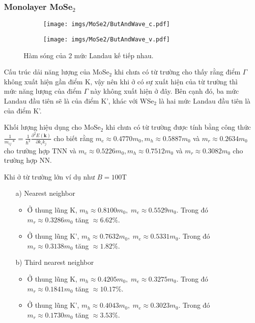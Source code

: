 \documentclass{article}
\begin{document}
\subsubsection*{Monolayer MoSe$_{2}$}
\begin{figure}[htb]
	\begin{subfigure}{0.495\textwidth}
		\centering
		\texttt{[image: imgs/MoSe2/ButAndWave\_c.pdf]}
	\end{subfigure}
	\begin{subfigure}{0.495\textwidth}
		\centering
		\texttt{[image: imgs/MoSe2/ButAndWave\_v.pdf]}
	\end{subfigure}
	\caption{Hàm sóng của 2 mức Landau kế tiếp nhau.}
\end{figure}
Cấu trúc dải năng lượng của MoSe$_{2}$ khi chưa có từ trường cho thấy rằng điểm $\Gamma$ không xuất hiện gần điểm K, vậy nên khi ở có sự xuất hiện của từ trường thì mức năng lượng của điểm $\Gamma$ này không xuất hiện ở đây. Bên cạnh đó, ba mức Landau đầu tiên sẽ là của điểm K', khác với WSe$_{2}$ là hai mức Landau đầu tiên là của điểm K'.

Khối lượng hiệu dụng cho MoSe$_{2}$ khi chưa có từ trường được tính bằng công thức $\frac{1}{m_{ij}*} =\frac{1}{\hbar^{2}} \frac{\partial^{2} E(\mathbf{k})}{\partial k_{i} k_{j}}$ cho biết rằng $m_{e} \approx 0.4770 m_{0}, m_{h} \approx 0.5887 m_{0}$ và $m_{r} \approx 0.2634 m_{0}$ cho trường hợp TNN và $m_{e} \approx 0.5226 m_{0}, m_{h} \approx 0.7512 m_{0}$ và $m_{r} \approx 0.3082m_{0}$ cho trường hợp NN.

Khi ở từ trường lớn ví dụ như $B = 100 $T
\begin{itemize}
	\item[a)] Nearest neighbor
	\begin{itemize}
		\item Ở thung lũng K, $m_{h} \approx 0.8100 m_{0},\; m_{e} \approx 0.5529 m_{0}$. Trong đó $m_{r} \approx 0.3286 m_{0}$ tăng $\approx 6.62\%$.
		
		\item Ở thung lũng K', $m_{h} \approx 0.7632 m_{0},\; m_{e} \approx 0.5331 m_{0}$. Trong đó $m_{r} \approx 0.3138 m_{0}$ tăng $\approx 1.82\%$.
	\end{itemize}
	\item[b)] Third nearest neighbor
	\begin{itemize}
		\item Ở thung lũng K, $m_{h} \approx 0.4205 m_{0},\; m_{e} \approx 0.3275 m_{0}$. 
		Trong đó $m_{r} \approx 0.1841 m_{0}$ tăng $\approx 10.17\%$.
		
		\item Ở thung lũng K', $m_{h} \approx 0.4043 m_{0},\; m_{e} \approx 0.3023 m_{0}$. 
		Trong đó $m_{r} \approx 0.1730 m_{0}$ tăng $\approx 3.53\%$.
	\end{itemize}
\end{itemize}
\end{document}
